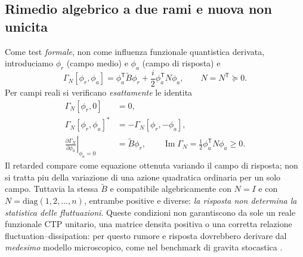 \documentclass[11pt,a4paper]{article}
\begin{document}
\subsection{Rimedio algebrico a due rami e nuova non unicita}
Come test \emph{formale}, non come influenza funzionale quantistica derivata,
introduciamo $\phi_r$ (campo medio) e $\phi_a$ (campo di risposta) e
\begin{equation}
 \Gamma_N[\phi_r,\phi_a]=
 \phi_a^{\mathsf T}\widetilde B\phi_r
 +\frac{i}{2}\phi_a^{\mathsf T}N\phi_a,
 \qquad N=N^{\mathsf T}\succeq0. \label{eq:r12at_ctp}
\end{equation}
Per campi reali si verificano \emph{esattamente} le identita
\begin{align}
 \Gamma_N[\phi_r,0]&=0,\\
 \Gamma_N[\phi_r,\phi_a]^*&=-\Gamma_N[\phi_r,-\phi_a],\\
 \left.\frac{\partial\Gamma_N}{\partial\phi_a}\right|_{\phi_a=0}
 &=\widetilde B\phi_r,\qquad
 \operatorname{Im}\Gamma_N=\tfrac12\phi_a^{\mathsf T}N\phi_a\ge0.
\end{align}
Il retarded compare come equazione ottenuta variando il campo di risposta;
non si tratta piu della variazione di una azione quadratica ordinaria per un solo campo.
Tuttavia la stessa $\widetilde B$ e compatibile algebricamente con
$N=I$ e con $N=\mathrm{diag}(1,2,\ldots,n)$, entrambe positive e diverse:
\emph{la risposta non determina la statistica delle fluttuazioni}.
Queste condizioni non garantiscono da sole un reale funzionale CTP unitario,
una matrice densita positiva o una corretta relazione fluctuation--dissipation:
per questo rumore e risposta dovrebbero derivare dal \emph{medesimo} modello
microscopico, come nel benchmark di gravita stocastica \cite{HuVerdaguer2008}.
\end{document}
